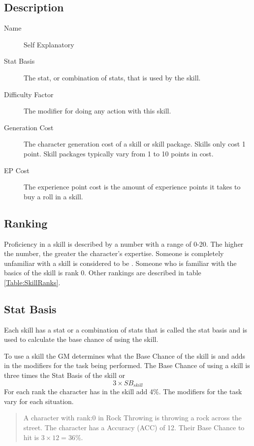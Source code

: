 \subsection{Description}

\begin{description}
	\item[Name] 
	Self Explanatory
	\item[Stat Basis] 
	The stat, or combination of stats, that is used by the skill. 
	\item[Difficulty Factor] 
	The modifier for doing any action with this skill.
	\item[Generation Cost]
	The character generation cost of a skill or skill package. Skills
	only cost 1 point. Skill packages typically vary from 1
	to 10 points in cost.
	\item[EP Cost] 
	The experience point cost is the amount of experience points it takes to
	buy a roll in a skill. 
\end{description}

\subsection{Ranking}

Proficiency in a skill is described by a number with a range of 0-20.
The higher the number, the greater the character's expertise. Someone
is completely unfamiliar with a skill is considered to be
. Someone who is familiar with the basics of
the skill is rank 0. Other rankings are described in table
\ref{Table:SkillRanks}.



\subsection{Stat Basis}

Each skill has a stat or a combination of stats that is called the 
stat basis and is used to calculate the base chance of using the 
skill. 

To use a skill the GM determines what the Base Chance of the skill is 
and adds in the modifiers for the task being performed.
The Base Chance of using a skill is three times the Stat Basis of the skill
or \[ 3 \times SB_{skill} \] For each rank the character has in the skill add 4\%.
The modifiers for the task vary for each situation.

\begin{quote}
A character with rank:0 in Rock Throwing is throwing a rock 
across the street. The character has a Accuracy (ACC) of 12. Their Base Chance 
to hit is \( 3 \times 12 = 36\% \).
\end{quote}

